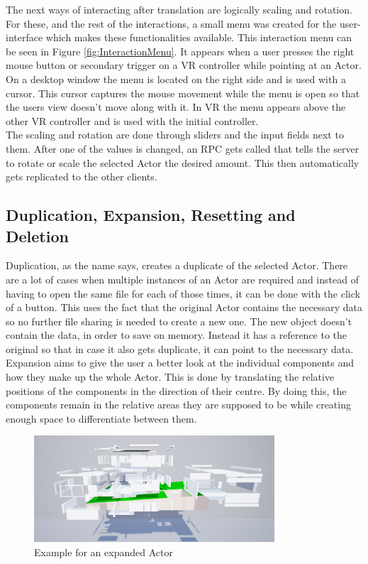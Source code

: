 The next ways of interacting after translation are logically scaling and rotation. For these, and the rest of the interactions, a small menu was created for the user-interface which makes these functionalities available. This interaction menu can be seen in Figure \ref{fig:InteractionMenu}. It appears when a user presses the right mouse button or secondary trigger on a VR controller while pointing at an Actor. On a desktop window the menu is located on the right side and is used with a cursor. This cursor captures the mouse movement while the menu is open so that the users view doesn't move along with it. In VR the menu appears above the other VR controller and is used with the initial controller.\\
The scaling and rotation are done through sliders and the input fields next to them. After one of the values is changed, an RPC gets called that tells the server to rotate or scale the selected Actor the desired amount. This then automatically gets replicated to the other clients.

\subsection{Duplication, Expansion, Resetting and Deletion}

Duplication, as the name says, creates a duplicate of the selected Actor. There are a lot of cases when multiple instances of an Actor are required and instead of having to open the same file for each of those times, it can be done with the click of a button. This uses the fact that the original Actor contains the necessary data so no further file sharing is needed to create a new one. The new object doesn't contain the data, in order to save on memory. Instead it has a reference to the original so that in case it also gets duplicate, it can point to the necessary data.\\
Expansion aims to give the user a better look at the individual components and how they make up the whole Actor. This is done by translating the relative positions of the components in the direction of their centre. By doing this, the components remain in the relative areas they are supposed to be while creating enough space to differentiate between them.

\begin{figure}[htpb]
	\centering
	\includegraphics[width=0.8\textwidth]{fig/ExpanedActor.png}
	\caption[Example for an expanded Actor]{Example for an expanded Actor\protect}
	\label{fig:ExpanedActor}
\end{figure}

